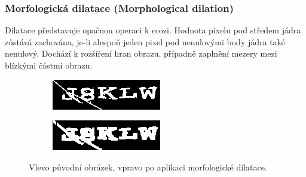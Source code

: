 \documentclass[
  field=ainfp,
  master=true,
  biblatex,
  sourcecodes=false,
  theorems=false,
  glossaries,
  index
]{kidiplom}
\begin{document}
\subsubsection*{Morfologická dilatace (Morphological dilation)}
Dilatace představuje opačnou operaci k erozi. Hodnota pixelu pod středem jádra zůstává zachována, je-li alespoň jeden pixel pod nenulovými body jádra také nenulový. Dochází k rozšíření hran obrazu, případně zaplnění mezery mezi blízkými částmi obrazu.
\begin{figure}[H]
\centering
\begin{subfigure}{.5\textwidth}
  \centering
  \includegraphics[width=.8\linewidth]{images/dilation_original.png}
\end{subfigure}%
\begin{subfigure}{.5\textwidth}
  \centering
  \includegraphics[width=.8\linewidth]{images/dilation_result.png}
\end{subfigure}
\caption{Vlevo původní obrázek, vpravo po aplikaci morfologické dilatace.}
\label{fig:inverse_example}
\end{figure}
\end{document}
